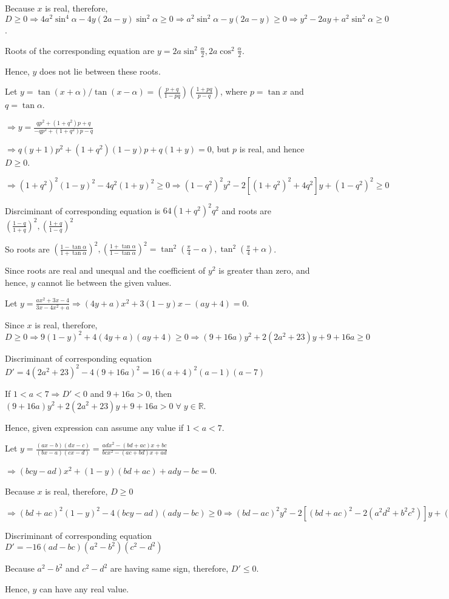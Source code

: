   Because $x$ is real, therefore, $D\geq 0 \Rightarrow 4a^2\sin^4\alpha - 4y(2a - y)\sin^2\alpha\geq 0
  \Rightarrow a^2\sin^2\alpha - y(2a - y)\geq 0 \Rightarrow y^2 - 2ay + a^2\sin^2\alpha\geq 0$.

  Roots of the corresponding equation are $y = 2a\sin^2\frac{\alpha}{2}, 2a\cos^2\frac{\alpha}{2}$.

  Hence, $y$ does not lie between these roots.
\item Let $y = \tan(x + \alpha)/\tan(x - \alpha) = \left(\frac{p + q}{1 - pq}\right)\left(\frac{1 + pq}{p -
  q}\right)$, where $p = \tan x$ and $q = \tan\alpha$.

  $\Rightarrow y = \frac{qp^2 + (1 + q^2)p + q}{-qp^2 + (1 + q^2)p - q}$

  $\Rightarrow q(y + 1)p^2 + (1 + q^2)(1 - y)p + q(1 + y) = 0$, but $p$ is real, and hence $D\geq 0$.

  $\Rightarrow (1 + q^2)^2(1 - y)^2 - 4q^2(1 + y)^2\geq 0 \Rightarrow (1 - q^2)^2y^2 - 2[(1 + q^2)^2 +
  4q^2]y + (1 - q^2)^2\geq 0$

  Disrciminant of corresponding equation is $64(1 + q^2)^2q^2$ and roots are $\left(\frac{1 - q}{1 +
    q}\right)^2, \left(\frac{1 + q}{1 - q}\right)^2$

  So roots are $\left(\frac{1 - \tan\alpha}{1 + \tan\alpha}\right)^2, \left(\frac{1 + \tan\alpha}{1 -
    \tan\alpha}\right)^2 = \tan^2\left(\frac{\pi}{4} - \alpha\right), \tan^2\left(\frac{\pi}{4} +
  \alpha\right)$.

  Since roots are real and unequal and the coefficient of $y^2$ is greater than zero, and hence, $y$ cannot
  lie between the given values.
\item Let $y = \frac{ax^2 + 3x - 4}{3x - 4x^2 + a} \Rightarrow (4y + a)x^2 + 3(1 - y)x - (ay + 4) = 0$.

  Since $x$ is real, therefore, $D\geq 0 \Rightarrow 9(1 - y)^2 + 4(4y + a)(ay + 4)\geq 0 \Rightarrow (9 +
  16a)y^2 + 2(2a^2 + 23)y + 9 + 16a\geq 0$

  Discriminant of corresponding equation $D' = 4(2a^2 + 23)^2 - 4(9 + 16a)^2 = 16(a + 4)^2(a - 1)(a - 7)$

  If $1 < a < 7 \Rightarrow D' < 0$ and $9 + 16a > 0$, then $(9 + 16a)y^2 + 2(2a^2 + 23)y + 9 + 16a >
  0\;\forall\;y\in\mathbb{R}$.

  Hence, given expression can assume any value if $1 < a < 7$.
\item Let $y = \frac{(ax - b)(dx - c)}{(bx - a)(cx - d)} = \frac{adx^2 - (bd + ac)x + bc}{bcx^2 - (ac + bd)x
  + ad}$

  $\Rightarrow (bcy - ad)x^2 + (1 - y)(bd + ac) + ady - bc = 0$.

  Because $x$ is real, therefore, $D\geq 0$

  $\Rightarrow (bd + ac)^2(1 - y)^2 - 4(bcy - ad)(ady - bc)\geq 0\Rightarrow (bd - ac)^2y^2 - 2[(bd + ac)^2
    - 2(a^2d^2 + b^2c^2)]y + (bd - ac)^2\geq 0$

  Discriminant of corresponding equation $D' = -16(ad - bc)(a^2 - b^2)(c^2 - d^2)$

  Because $a^2 - b^2$ and $c^2 - d^2$ are having same sign, therefore, $D' \leq 0$.

  Hence, $y$ can have any real value.
\stopitemize
